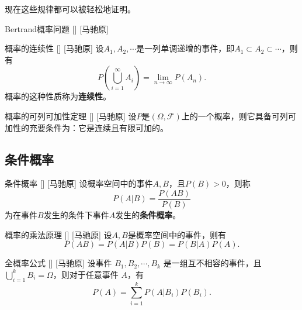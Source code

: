 \documentclass[UTF8]{ctexart}
\begin{document}
        现在这些规律都可以被轻松地证明。

        \begin{cxmp}
            []
            {Bertrand概率问题}
            []
            [马驰原]
        \end{cxmp}

        \begin{dfn}
            []
            {概率的连续性}
            []
            [马驰原]
            设$A_1,A_2,\cdots$是一列单调递增的事件，即$A_1\subset A_2\subset\cdots$，则有\[P\left(\bigcup_{i=1}^{\infty}A_i\right)=\lim_{n\to\infty}P(A_n).\]概率的这种性质称为\textbf{连续性}。
        \end{dfn}
        
        \begin{thm}
            []
            {概率的可列可加性定理}
            []
            [马驰原]
            设$P$是$(\Omega,\mathcal{F})$上的一个概率，则它具备可列可加性的充要条件为：它是连续且有限可加的。
        \end{thm}

        \begin{prf}
            
        \end{prf}

    \subsection{条件概率}

        \begin{dfn}
            []
            {条件概率}
            []
            [马驰原]
            设概率空间中的事件$A,B$，且$P(B)>0$，则称\[P(A|B)=\frac{P(AB)}{P(B)}\]为在事件$B$发生的条件下事件$A$发生的\textbf{条件概率}。
        \end{dfn}

        \begin{ppt}
            []
            {概率的乘法原理}
            []
            [马驰原]
            设$A,B$是概率空间中的事件，则有\[P(AB)=P(A|B)P(B)=P(B|A)P(A).\]
        \end{ppt}

        \begin{thm}
            []
            {全概率公式}
            []
            [马驰原]
            设事件 $B_1,B_2,\cdots,B_k$ 是一组互不相容的事件，且 $\bigcup_{i=1}^{k}B_i=\Omega$，则对于任意事件 $A$，有
            \[P(A)=\sum_{i=1}^{k}P(A|B_i)P(B_i).\]
        \end{thm}
\end{document}
